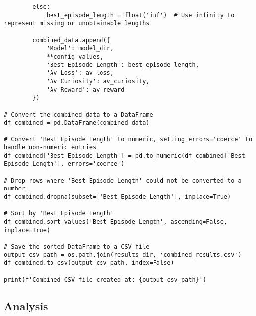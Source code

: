 \begin{lstlisting}
        else:
            best_episode_length = float('inf')  # Use infinity to represent missing or unobtainable lengths

        combined_data.append({
            'Model': model_dir,
            **config_values,
            'Best Episode Length': best_episode_length,
            'Av Loss': av_loss,
            'Av Curiosity': av_curiosity,
            'Av Reward': av_reward
        })

# Convert the combined data to a DataFrame
df_combined = pd.DataFrame(combined_data)

# Convert 'Best Episode Length' to numeric, setting errors='coerce' to handle non-numeric entries
df_combined['Best Episode Length'] = pd.to_numeric(df_combined['Best Episode Length'], errors='coerce')

# Drop rows where 'Best Episode Length' could not be converted to a number
df_combined.dropna(subset=['Best Episode Length'], inplace=True)

# Sort by 'Best Episode Length'
df_combined.sort_values('Best Episode Length', ascending=False, inplace=True)

# Save the sorted DataFrame to a CSV file
output_csv_path = os.path.join(results_dir, 'combined_results.csv')
df_combined.to_csv(output_csv_path, index=False)

print(f'Combined CSV file created at: {output_csv_path}')

\end{lstlisting}


\subsection{Analysis}\label{sec:analysis}

